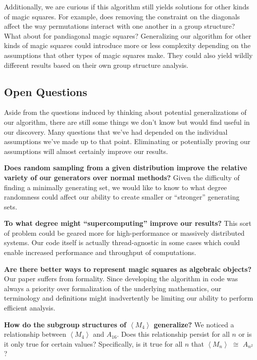 \documentclass{rhumj_new}
\begin{document}
Additionally, we are curious if this algorithm still yields solutions for other kinds of magic
squares. For example, does removing the constraint on the diagonals affect the way permutations
interact with one another in a group structure? What about for pandiagonal magic squares?
Generalizing our algorithm for other kinds of magic squares could introduce more or less complexity
depending on the assumptions that other types of magic squares make. They could also yield wildly
different results based on their own group structure analysis.

\subsection{Open Questions}

Aside from the questions induced by thinking about potential generalizations of our
algorithm, there are still some things we don't know but would find useful in our discovery. Many
questions that we've had depended on the individual assumptions we've made up to that point.
Eliminating or potentially proving our assumptions will almost certainly improve our results.

\textbf{Does random sampling from a given distribution improve the relative variety of our
  generators over normal methods?} Given the difficulty of finding a minimally generating set, we
would like to know to what degree randomness could affect our ability to create smaller or
``stronger'' generating sets.

\textbf{To what degree might ``supercomputing'' improve our results?} This sort of problem could be
geared more for high-performance or massively distributed systems. Our code itself is actually
thread-agnostic in some cases which could enable increased performance and throughput of
computations.

\textbf{Are there better ways to represent magic squares as algebraic objects?} Our paper suffers
from formality. Since developing the algorithm in code was always a priority over formalization of
the underlying mathematics, our terminology and definitions might inadvertently be limiting our
ability to perform efficient analysis.

\textbf{How do the subgroup structures of $\left\langle M_4 \right\rangle$ generalize?} We noticed
a relationship between $\left\langle M_4 \right\rangle$ and $A_{16}$. Does this relationship
persist for all $n$ or is it only true for certain values? Specifically, is it true for all $n$
that $\left\langle M_n \right\rangle$ $\cong$ $A_{n^2}$?
\end{document}
